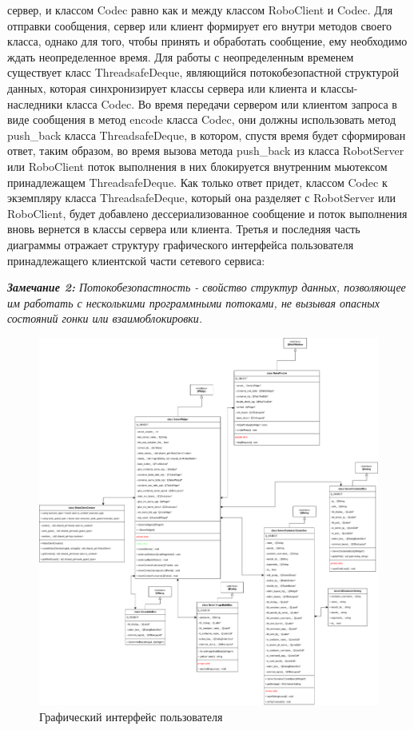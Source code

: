 \documentclass[a4paper, 14pt]{extreport}
\begin{document}
сервер, и классом Codec равно как и между классом RoboClient и Codec. Для отправки сообщения, сервер или клиент формирует его внутри
методов своего класса, однако для того, чтобы принять и обработать сообщение, ему необходимо ждать неопределенное время. Для работы 
с неопределенным временем существует класс ThreadsafeDeque, являющийся потокобезопастной структурой данных, которая синхронизирует 
классы сервера или клиента и классы-наследники класса Codec. Во время передачи сервером или клиентом запроса в виде сообщения в метод 
encode класса Codec, они должны использовать метод push\_back класса ThreadsafeDeque, в котором, спустя время будет сформирован 
ответ, таким образом, во время вызова метода push\_back из класса RobotServer или RoboClient поток выполнения в них блокируется внутренним 
мьютексом принадлежащем ThreadsafeDeque. Как только ответ придет, классом Codec к экземпляру класса ThreadsafeDeque, который она разделяет
с RobotServer или RoboClient, будет добавлено дессериализованное сообщение и поток выполнения вновь вернется в классы сервера или клиента.
Третья и последняя часть диаграммы отражает структуру графического интерфейса пользователя принадлежащего клиентской части сетевого сервиса:
\par\noindent \textsl{\textbf{Замечание 2:} Потокобезопастность - свойство структур данных, позволяющее им работать с несколькими 
программными потоками, не вызывая опасных состояний гонки или взаимоблокировки.}
\begin{figure}[ht]
\begin{center}
\includegraphics[scale = 0.265]{./figure/gui_uml}
\caption{Графический интерфейс пользователя}
\label{fig:manip_photo}
\end{center}
\end{figure}
\end{document}
